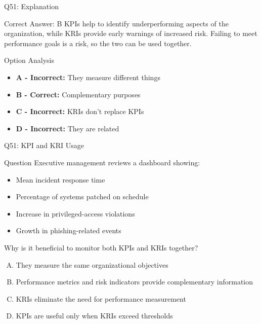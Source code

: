 \documentclass{beamer}
\begin{document}
	\begin{frame}{Q51: Explanation}
		\begin{block}{Correct Answer: B}
			KPIs help to identify underperforming aspects of the organization, while KRIs provide early warnings of increased risk. Failing to meet performance goals is a risk, so the two can be used together.
		\end{block}
		\begin{block}{Option Analysis}
			\begin{itemize}
				\item \textbf{A - Incorrect:} They measure different things
				\item \textbf{B - Correct:} Complementary purposes
				\item \textbf{C - Incorrect:} KRIs don't replace KPIs
				\item \textbf{D - Incorrect:} They are related
			\end{itemize}
		\end{block}
	\end{frame}
	
	
	\begin{frame}{Q51: KPI and KRI Usage}
		\begin{block}{Question}
			Executive management reviews a dashboard showing:
			
			\begin{itemize}
				\item Mean incident response time
				\item Percentage of systems patched on schedule
				\item Increase in privileged-access violations
				\item Growth in phishing-related events
			\end{itemize}
			
			Why is it beneficial to monitor both KPIs and KRIs together?
		\end{block}
		
		\begin{enumerate}[(A)]
			\item They measure the same organizational objectives
			\item Performance metrics and risk indicators provide complementary information
			\item KRIs eliminate the need for performance measurement
			\item KPIs are useful only when KRIs exceed thresholds
		\end{enumerate}
	\end{frame}
	
\end{document}
